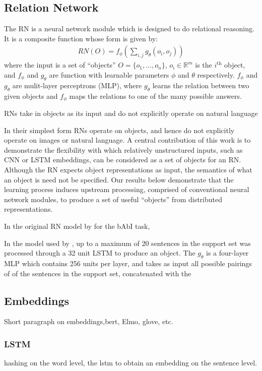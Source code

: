 \documentclass{article}
\begin{document}
\subsection{Relation Network}
The RN is a neural network module which is designed to do relational reasoning. It is a composite function whose form is given by:
\begin{align}
RN(O) = f_\phi\left(\sum_{i,j}g_\theta(o_i,o_j)\right)\label{eq:RNform}
\end{align}
where the input is a set of ``objects'' $O=\{o_1,\ldots,o_n\}$, $o_i \in \mathbb{R}^m$ is the $i^{\text{th}}$ object, and $f_\phi$ and $g_\theta$ are function with learnable parameters $\phi$ and $\theta$ respectively. $f_\phi$ and $g_\theta$ are mulit-layer perceptrons (MLP), where $g_\theta$ learns the relation between two given objects and $f_\phi$ maps the relations to one of the many possible answers. 

RNs take in objects as its input and do not explicitly operate on natural language

In their simplest form RNs operate on objects, and hence do not explicitly operate on images or natural language. A central contribution of this work is to demonstrate the flexibility with which relatively unstructured inputs, such as CNN or LSTM embeddings, can be considered as a set of objects for an RN. Although the RN expects object representations as input, the semantics of what an object is need not be specified. Our results below demonstrate that the learning process induces upstream processing, comprised of conventional neural network modules, to produce a set of useful “objects” from distributed representations.

In the original RN model by \cite{Santoro2017} for the bAbI task,  

In the model used by \cite{Santoro2017}, up to a maximum of 20 sentences in the support set was processed through a 32 unit LSTM to produce an object. The $g_{\theta}$ is a four-layer MLP which contains 256 units per layer, and takes as input all possible pairings of of the sentences in the support set, concatenated with the 


\subsection{Embeddings}
Short paragraph on embeddings,bert,  Elmo, glove, etc.


\subsubsection{LSTM}
hashing on the word level, the lstm to obtain an embedding on the sentence level.
\end{document}

